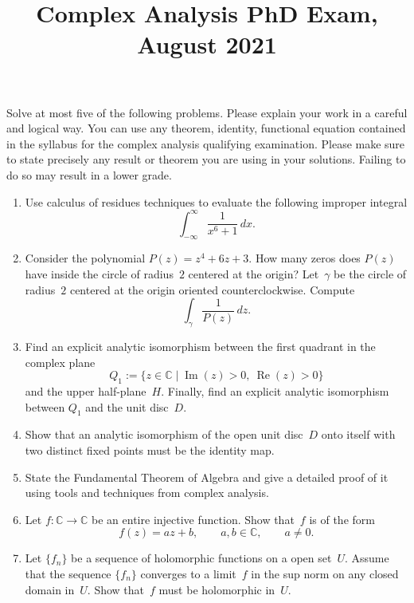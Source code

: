 \documentclass[11pt,letterpaper]{article}
\title{Complex Analysis PhD Exam, August 2021}
\author{}
\date{}
\newenvironment{examproblems}[2]{%
  \def\ProblemHeadingTag{#2}%
  \AssignTaggingSocketPlug{block/list/label}{examproblem}%
  \begin{enumerate}%
  \setcounter{enumi}{#1}%
  \renewcommand{\labelenumi}{\textbf{\theenumi.}}%
  \setlength{\topsep}{0.35em}%
  \setlength{\partopsep}{0pt}%
  \setlength{\itemsep}{0.48em}%
  \setlength{\parsep}{0.18em}%
}{\end{enumerate}}
\newenvironment{examinstructions}{%
  \par\begingroup\itshape
}{%
  \par\endgroup\vspace{0.18em}
}
\begin{document}
\maketitle
\thispagestyle{empty}
\begin{examinstructions}
Solve at most five of the following problems. Please explain your work in a careful and logical way. You can use any theorem, identity, functional equation contained in the syllabus for the complex analysis qualifying examination. Please make sure to state precisely any result or theorem you are using in your solutions. Failing to do so may result in a lower grade.
\end{examinstructions}
\begin{examproblems}{0}{H2}
\def\ProblemHeadingText{Problem 1.}
\item
Use calculus of residues techniques to evaluate the following improper integral
\[
\int_{-\infty}^{\infty}\frac{1}{x^6+1}\,dx.
\]
\def\ProblemHeadingText{Problem 2.}
\item
Consider the polynomial \(P(z)=z^4+6z+3\). How many zeros does \(P(z)\) have inside the circle of radius~\(2\) centered at the origin? Let~\(\gamma\) be the circle of radius~\(2\) centered at the origin oriented counterclockwise. Compute
\[
\int_\gamma \frac{1}{P(z)}\,dz.
\]
\def\ProblemHeadingText{Problem 3.}
\item
Find an explicit analytic isomorphism between the first quadrant in the complex plane
\[
Q_1:=\{z\in\mathbb C\mid \operatorname{Im}(z)>0,\ \operatorname{Re}(z)>0\}
\]
 and the upper half-plane~\(H\). Finally, find an explicit analytic isomorphism between \(Q_1\) and the unit disc~\(D\).
\def\ProblemHeadingText{Problem 4.}
\item
Show that an analytic isomorphism of the open unit disc~\(D\) onto itself with two distinct fixed points must be the identity map.
\def\ProblemHeadingText{Problem 5.}
\item
State the Fundamental Theorem of Algebra and give a detailed proof of it using tools and techniques from complex analysis.
\def\ProblemHeadingText{Problem 6.}
\item
Let \(f:\mathbb C\to\mathbb C\) be an entire injective function. Show that~\(f\) is of the form
\[
f(z)=az+b,\qquad a,b\in\mathbb C,\qquad a\ne 0.
\]
\def\ProblemHeadingText{Problem 7.}
\item
Let \(\{f_n\}\) be a sequence of holomorphic functions on a open set~\(U\). Assume that the sequence \(\{f_n\}\) converges to a limit~\(f\) in the sup norm on any closed domain in~\(U\). Show that~\(f\) must be holomorphic in~\(U\).

\end{examproblems}
\end{document}

